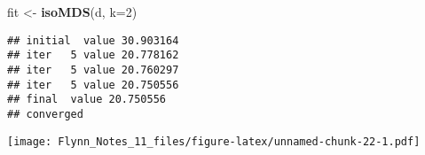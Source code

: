 \documentclass[]{article}
\newenvironment{Shaded}{\begin{snugshade}}{\end{snugshade}}
\newcommand{\KeywordTok}[1]{\textcolor[rgb]{0.13,0.29,0.53}{\textbf{#1}}}
\newcommand{\DataTypeTok}[1]{\textcolor[rgb]{0.13,0.29,0.53}{#1}}
\newcommand{\DecValTok}[1]{\textcolor[rgb]{0.00,0.00,0.81}{#1}}
\newcommand{\FloatTok}[1]{\textcolor[rgb]{0.00,0.00,0.81}{#1}}
\newcommand{\StringTok}[1]{\textcolor[rgb]{0.31,0.60,0.02}{#1}}
\newcommand{\OperatorTok}[1]{\textcolor[rgb]{0.81,0.36,0.00}{\textbf{#1}}}
\newcommand{\NormalTok}[1]{#1}
\begin{document}
\begin{Shaded}
\begin{Highlighting}[]
\NormalTok{fit <-}\StringTok{ }\KeywordTok{isoMDS}\NormalTok{(d, }\DataTypeTok{k=}\DecValTok{2}\NormalTok{)}
\end{Highlighting}
\end{Shaded}

\begin{verbatim}
## initial  value 30.903164 
## iter   5 value 20.778162
## iter   5 value 20.760297
## iter   5 value 20.750556
## final  value 20.750556 
## converged
\end{verbatim}

\begin{Shaded}
\end{Shaded}

\texttt{[image: Flynn\_Notes\_11\_files/figure-latex/unnamed-chunk-22-1.pdf]}
\end{document}
